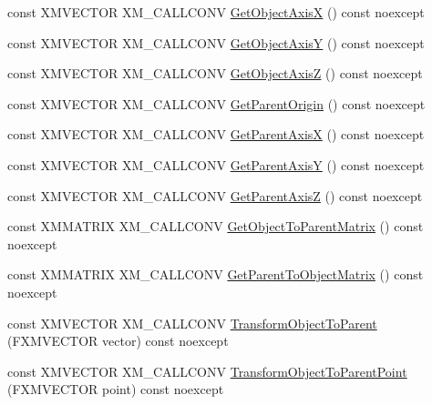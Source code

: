 \begin{DoxyCompactItemize}
\item 
const X\+M\+V\+E\+C\+T\+OR X\+M\+\_\+\+C\+A\+L\+L\+C\+O\+NV \mbox{\hyperlink{classmage_1_1_s1_q_t_transform3_d_a44f76c6dedb6e5d4641764bcf5e2829d}{Get\+Object\+AxisX}} () const noexcept
\item 
const X\+M\+V\+E\+C\+T\+OR X\+M\+\_\+\+C\+A\+L\+L\+C\+O\+NV \mbox{\hyperlink{classmage_1_1_s1_q_t_transform3_d_a92f5aff468e388295fdfa0eedf44e436}{Get\+Object\+AxisY}} () const noexcept
\item 
const X\+M\+V\+E\+C\+T\+OR X\+M\+\_\+\+C\+A\+L\+L\+C\+O\+NV \mbox{\hyperlink{classmage_1_1_s1_q_t_transform3_d_ad84b6c5ba1ba1026fd986647e9297d61}{Get\+Object\+AxisZ}} () const noexcept
\item 
const X\+M\+V\+E\+C\+T\+OR X\+M\+\_\+\+C\+A\+L\+L\+C\+O\+NV \mbox{\hyperlink{classmage_1_1_s1_q_t_transform3_d_ad8ac0803a34f03e7ab7dfdc79256631c}{Get\+Parent\+Origin}} () const noexcept
\item 
const X\+M\+V\+E\+C\+T\+OR X\+M\+\_\+\+C\+A\+L\+L\+C\+O\+NV \mbox{\hyperlink{classmage_1_1_s1_q_t_transform3_d_ac231197ac3cf542642c33e6c7728dd50}{Get\+Parent\+AxisX}} () const noexcept
\item 
const X\+M\+V\+E\+C\+T\+OR X\+M\+\_\+\+C\+A\+L\+L\+C\+O\+NV \mbox{\hyperlink{classmage_1_1_s1_q_t_transform3_d_a5cbba8b2f6a1acd1918ddd77911a7fb1}{Get\+Parent\+AxisY}} () const noexcept
\item 
const X\+M\+V\+E\+C\+T\+OR X\+M\+\_\+\+C\+A\+L\+L\+C\+O\+NV \mbox{\hyperlink{classmage_1_1_s1_q_t_transform3_d_aae1d106ca39ad669e0250ee5d3a9a426}{Get\+Parent\+AxisZ}} () const noexcept
\item 
const X\+M\+M\+A\+T\+R\+IX X\+M\+\_\+\+C\+A\+L\+L\+C\+O\+NV \mbox{\hyperlink{classmage_1_1_s1_q_t_transform3_d_a5233527aca55e49e951276ae05d9421c}{Get\+Object\+To\+Parent\+Matrix}} () const noexcept
\item 
const X\+M\+M\+A\+T\+R\+IX X\+M\+\_\+\+C\+A\+L\+L\+C\+O\+NV \mbox{\hyperlink{classmage_1_1_s1_q_t_transform3_d_ad9d7ec001a3ae7144aee3c0278798919}{Get\+Parent\+To\+Object\+Matrix}} () const noexcept
\item 
const X\+M\+V\+E\+C\+T\+OR X\+M\+\_\+\+C\+A\+L\+L\+C\+O\+NV \mbox{\hyperlink{classmage_1_1_s1_q_t_transform3_d_aa68b1c628f07a92b5c285e9ca7671724}{Transform\+Object\+To\+Parent}} (F\+X\+M\+V\+E\+C\+T\+OR vector) const noexcept
\item 
const X\+M\+V\+E\+C\+T\+OR X\+M\+\_\+\+C\+A\+L\+L\+C\+O\+NV \mbox{\hyperlink{classmage_1_1_s1_q_t_transform3_d_a1b7e30a03037b902f7f2e08641b71a91}{Transform\+Object\+To\+Parent\+Point}} (F\+X\+M\+V\+E\+C\+T\+OR point) const noexcept

\end{DoxyCompactItemize}
